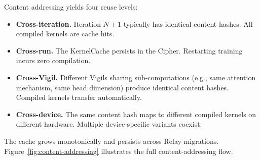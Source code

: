Content addressing yields four reuse levels:

\begin{itemize}
  \item \textbf{Cross-iteration.} Iteration $N{+}1$ typically has identical content hashes. All compiled kernels are cache hits.
  \item \textbf{Cross-run.} The KernelCache persists in the Cipher. Restarting training incurs zero compilation.
  \item \textbf{Cross-Vigil.} Different Vigils sharing sub-computations (e.g., same attention mechanism, same head dimension) produce identical content hashes. Compiled kernels transfer automatically.
  \item \textbf{Cross-device.} The same content hash maps to different compiled kernels on different hardware. Multiple device-specific variants coexist.
\end{itemize}

The cache grows monotonically and persists across Relay migrations.
Figure~\ref{fig:content-addressing} illustrates the full content-addressing flow.

